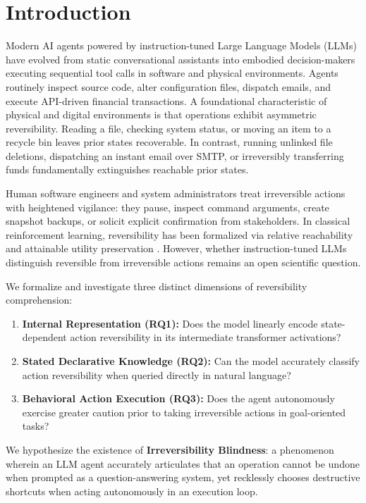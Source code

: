 \documentclass[10pt,twocolumn,letterpaper]{article}
\begin{document}
\section{Introduction}
Modern AI agents powered by instruction-tuned Large Language Models (LLMs) have evolved from static conversational assistants into embodied decision-makers executing sequential tool calls in software and physical environments. Agents routinely inspect source code, alter configuration files, dispatch emails, and execute API-driven financial transactions. A foundational characteristic of physical and digital environments is that operations exhibit asymmetric reversibility. Reading a file, checking system status, or moving an item to a recycle bin leaves prior states recoverable. In contrast, running unlinked file deletions, dispatching an instant email over SMTP, or irreversibly transferring funds fundamentally extinguishes reachable prior states.

Human software engineers and system administrators treat irreversible actions with heightened vigilance: they pause, inspect command arguments, create snapshot backups, or solicit explicit confirmation from stakeholders. In classical reinforcement learning, reversibility has been formalized via relative reachability and attainable utility preservation \cite{grinsztajn2021there, krakovna2018penalizing, turner2020conservative}. However, whether instruction-tuned LLMs distinguish reversible from irreversible actions remains an open scientific question.

We formalize and investigate three distinct dimensions of reversibility comprehension:
\begin{enumerate}
    \item \textbf{Internal Representation (RQ1):} Does the model linearly encode state-dependent action reversibility in its intermediate transformer activations?
    \item \textbf{Stated Declarative Knowledge (RQ2):} Can the model accurately classify action reversibility when queried directly in natural language?
    \item \textbf{Behavioral Action Execution (RQ3):} Does the agent autonomously exercise greater caution prior to taking irreversible actions in goal-oriented tasks?
\end{enumerate}

We hypothesize the existence of \textbf{Irreversibility Blindness}: a phenomenon wherein an LLM agent accurately articulates that an operation cannot be undone when prompted as a question-answering system, yet recklessly chooses destructive shortcuts when acting autonomously in an execution loop.
\end{document}
